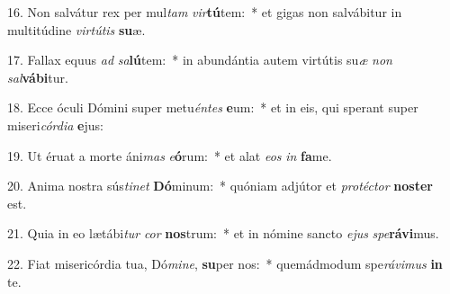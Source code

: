 16. Non salvátur rex per mul\textit{tam} \textit{vir}\textbf{tú}tem:~*  et gigas non salvábitur in multitúdine \textit{vir}\textit{tú}\textit{tis} \textbf{su}æ.\

17. Fallax equus \textit{ad} \textit{sa}\textbf{lú}tem:~*  in abundántia autem virtútis su\textit{æ} \textit{non} \textit{sal}\textbf{vá}\textbf{bi}tur.\

18. Ecce óculi Dómini super metu\textit{én}\textit{tes} \textbf{e}um:~*  et in eis, qui sperant super miseri\textit{cór}\textit{di}\textit{a} \textbf{e}jus:\

19. Ut éruat a morte áni\textit{mas} \textit{e}\textbf{ó}rum:~*  et alat \textit{e}\textit{os} \textit{in} \textbf{fa}me.\

20. Anima nostra sús\textit{ti}\textit{net} \textbf{Dó}minum:~*  quóniam adjútor et \textit{pro}\textit{téc}\textit{tor} \textbf{nos}\textbf{ter} est.\

21. Quia in eo lætábi\textit{tur} \textit{cor} \textbf{nos}trum:~*  et in nómine sancto \textit{e}\textit{jus} \textit{spe}\textbf{rá}\textbf{vi}mus.\

22. Fiat misericórdia tua, Dó\textit{mi}\textit{ne}, \textbf{su}per nos:~*  quemádmodum spe\textit{rá}\textit{vi}\textit{mus} \textbf{in} te.\

